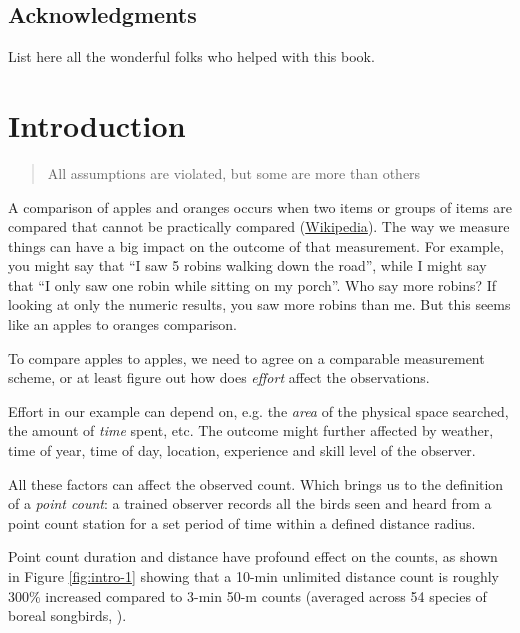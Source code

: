 \documentclass[12pt,]{book}
\begin{document}
\hypertarget{acknowledgments}{%
\section*{Acknowledgments}\label{acknowledgments}}

List here all the wonderful folks who helped with this book.

\hypertarget{intro}{%
\chapter{Introduction}\label{intro}}

\begin{quote}
All assumptions are violated, but some are more than others
\end{quote}

A comparison of apples and oranges occurs when two items or
groups of items are compared that cannot be practically compared
(\href{https://en.wikipedia.org/wiki/Apples_and_oranges}{Wikipedia}).
The way we measure things can have a big impact on the outcome
of that measurement. For example, you might say that
``I saw 5 robins walking down the road'', while I might say that
``I only saw one robin while sitting on my porch''.
Who say more robins? If looking at only the numeric results,
you saw more robins than me. But this seems like
an apples to oranges comparison.

To compare apples to apples, we need to agree on a comparable
measurement scheme, or at least figure out how does \emph{effort}
affect the observations.

Effort in our example can depend on, e.g.
the \emph{area} of the physical space searched,
the amount of \emph{time} spent, etc.
The outcome might further affected by
weather, time of year, time of day, location,
experience and skill level of the observer.

All these factors can affect the observed count.
Which brings us to the definition of a \emph{point count}:
a trained observer
records all the birds
seen and heard
from a point count station
for a set period of time
within a defined distance radius.

Point count duration and distance have profound effect
on the counts, as shown in Figure \ref{fig:intro-1}
showing that a 10-min unlimited distance count
is roughly 300\% increased compared to 3-min 50-m counts
(averaged across 54 species of boreal songbirds, \citep{matsuoka2014}).
\end{document}
